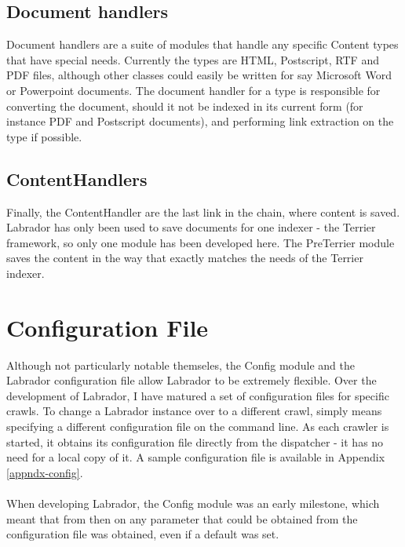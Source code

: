 \subsection{Document handlers}
Document handlers are a suite of modules that handle any specific Content types that have special needs. Currently the types are HTML, Postscript, RTF and PDF files, although other classes could easily be written for say Microsoft Word or Powerpoint documents. The document handler for a type is responsible for converting the document, should it not be indexed in its current form (for instance PDF and Postscript documents), and performing link extraction on the type if possible.

\subsection{ContentHandlers}
Finally, the ContentHandler are the last link in the chain, where content is saved. Labrador has only been used to save documents for one indexer - the Terrier framework, so only one module has been developed here. The PreTerrier module saves the content in the way that exactly matches the needs of the Terrier indexer.

\section{Configuration File}
Although not particularly notable themseles, the Config module and the Labrador configuration file allow Labrador to be extremely flexible. Over the development of Labrador, I have matured a set of configuration files for specific crawls. To change a Labrador instance over to a different crawl, simply means specifying a different configuration file on the command line. As each crawler is started, it obtains its configuration file directly from the dispatcher - it has no need for a local copy of it. A sample configuration file is available in Appendix \ref{appndx-config}.\\
\ \\
When developing Labrador, the Config module was an early milestone, which meant that from then on any parameter that could be obtained from the configuration file was obtained, even if a default was set.

